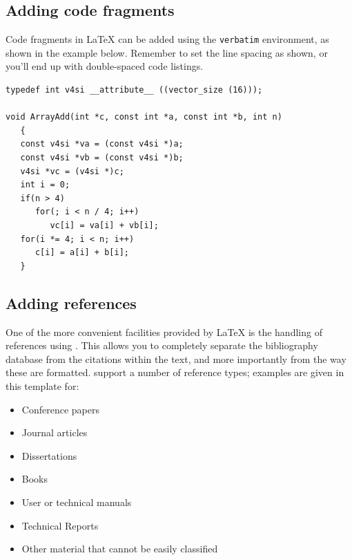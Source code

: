 \subsection{Adding code fragments}
Code fragments in \LaTeX{} can be added using the \verb|verbatim| environment,
as shown in the example below.
Remember to set the line spacing as shown, or you'll end up with double-spaced
code listings.

\singlespaced
\begin{verbatim}
typedef int v4si __attribute__ ((vector_size (16)));

void ArrayAdd(int *c, const int *a, const int *b, int n)
   {
   const v4si *va = (const v4si *)a;
   const v4si *vb = (const v4si *)b;
   v4si *vc = (v4si *)c;
   int i = 0;
   if(n > 4)
      for(; i < n / 4; i++)
         vc[i] = va[i] + vb[i];
   for(i *= 4; i < n; i++)
      c[i] = a[i] + b[i];
   }
\end{verbatim}
\doublespaced

\subsection{Adding references}
One of the more convenient facilities provided by \LaTeX{} is the handling of
references using \BibTeX.
This allows you to completely separate the bibliography database from the
citations within the text, and more importantly from the way these are
formatted.
\BibTeX support a number of reference types; examples are given in this
template for:
\begin{itemize}
\item Conference papers \cite{bsw10icc}
\item Journal articles \cite{gamal}
\item Dissertations \cite{tunstall}
\item Books \cite{press}
\item User or technical manuals \cite{cuda-pg,netpbm}
\item Technical Reports \cite{bw1994}
\item Other material that cannot be easily classified \cite{farrell}
\end{itemize}
